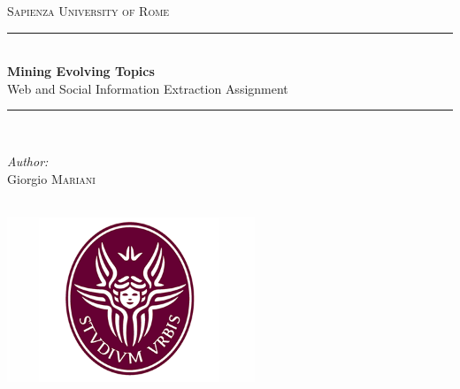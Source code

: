 \documentclass[10pt]{article}
\begin{document}
\begin{titlepage}
\newcommand{\HRule}{\rule{\linewidth}{0.5mm}}
\center 
\textsc{\LARGE Sapienza University of Rome }\\[1.5cm] 
\HRule \\[0.4cm]
{ \huge \textbf {Mining Evolving Topics }}\\[.75cm]
{\Large Web and Social Information Extraction Assignment}\\[0.4cm]
\HRule \\[1.5cm]

\begin{minipage}{0.4\textwidth}
 \large
\emph{Author:}\\[0.5cm]
\Large  Giorgio \textsc{Mariani} 
\end{minipage} \\[3cm]

\includegraphics[width=7.4cm]{logo.png}
\vfill 
\end{titlepage}

\newcommand{\DSone}{\textbf{DS-1}}
\newcommand{\DStwo}{\textbf{DS-2}}
\newcommand{\set}[1]{#1}
\tableofcontents


\newpage

\newpage

\newpage

\newpage

\end{document}
